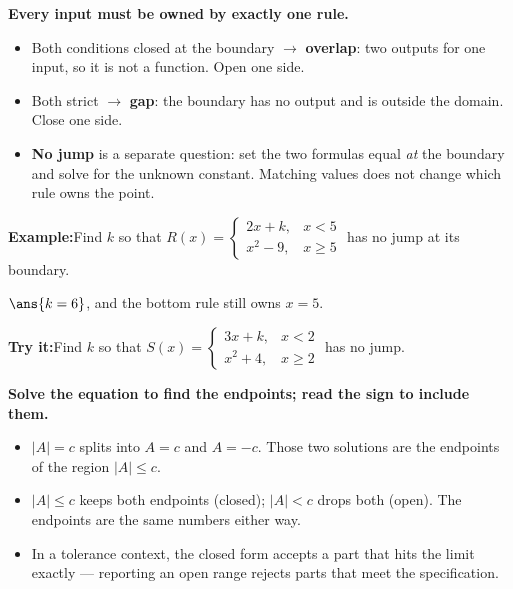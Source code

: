 \documentclass[12pt]{article}
\begin{document}
\begin{formulabox}
\textbf{Every input must be owned by exactly one rule.}
\begin{itemize}[leftmargin=0.8cm, itemsep=1pt, topsep=2pt]
  \item Both conditions closed at the boundary $\rightarrow$ \textbf{overlap}: two
        outputs for one input, so it is not a function. Open one side.
  \item Both strict $\rightarrow$ \textbf{gap}: the boundary has no output and is
        outside the domain. Close one side.
  \item \textbf{No jump} is a separate question: set the two formulas equal
        \emph{at} the boundary and solve for the unknown constant. Matching values
        does not change which rule owns the point.
\end{itemize}
\end{formulabox}

\begin{examplebox}
\textbf{Example:}\quad Find $k$ so that
$R(x) = \begin{cases} 2x + k, & x < 5 \\ x^2 - 9, & x \ge 5 \end{cases}$
has no jump at its boundary.



$\ans{k = 6}$, and the bottom rule still owns $x = 5$.
\end{examplebox}

\begin{tryitbox}
\textbf{Try it:}\quad Find $k$ so that
$S(x) = \begin{cases} 3x + k, & x < 2 \\ x^2 + 4, & x \ge 2 \end{cases}$
has no jump.

\end{tryitbox}


\begin{formulabox}
\textbf{Solve the equation to find the endpoints; read the sign to include them.}
\begin{itemize}[leftmargin=0.8cm, itemsep=1pt, topsep=2pt]
  \item $|A| = c$ splits into $A = c$ and $A = -c$. Those two solutions are the
        endpoints of the region $|A| \le c$.
  \item $|A| \le c$ keeps both endpoints (closed); $|A| < c$ drops both (open).
        The endpoints are the same numbers either way.
  \item In a tolerance context, the closed form accepts a part that hits the limit
        exactly --- reporting an open range rejects parts that meet the
        specification.
\end{itemize}
\end{formulabox}
\end{document}
